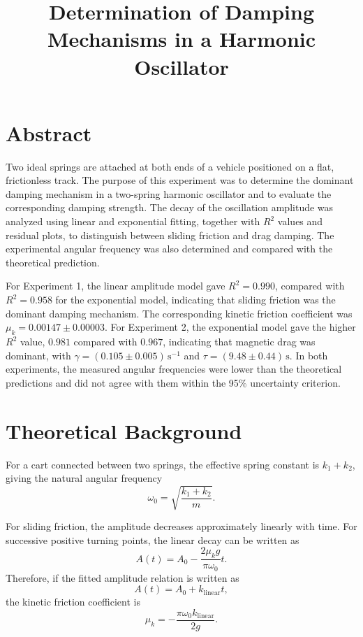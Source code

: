 \documentclass[12pt,a4paper]{article}
\title{Determination of Damping Mechanisms in a Harmonic Oscillator}
\date{}
\begin{document}
\maketitle

\section{Abstract}

Two ideal springs are attached at both ends of a vehicle positioned on a flat, frictionless track. The purpose of this experiment was to determine the dominant damping mechanism in a two-spring harmonic oscillator and to evaluate the corresponding damping strength. The decay of the oscillation amplitude was analyzed using linear and exponential fitting, together with $R^2$ values and residual plots, to distinguish between sliding friction and drag damping. The experimental angular frequency was also determined and compared with the theoretical prediction.

For Experiment 1, the linear amplitude model gave $R^2=0.990$, compared with $R^2=0.958$ for the exponential model, indicating that sliding friction was the dominant damping mechanism. The corresponding kinetic friction coefficient was $\mu_k=0.00147\pm0.00003$. For Experiment 2, the exponential model gave the higher $R^2$ value, $0.981$ compared with $0.967$, indicating that magnetic drag was dominant, with $\gamma=(0.105\pm0.005)\,\mathrm{s^{-1}}$ and $\tau=(9.48\pm0.44)\,\mathrm{s}$. In both experiments, the measured angular frequencies were lower than the theoretical predictions and did not agree with them within the 95\% uncertainty criterion.


\section{Theoretical Background}

For a cart connected between two springs, the effective spring constant is $k_1+k_2$, giving the natural angular frequency
\[
\omega_0=\sqrt{\frac{k_1+k_2}{m}}.
\]

For sliding friction, the amplitude decreases approximately linearly with time. For successive positive turning points, the linear decay can be written as
\[
A(t)=A_0-\frac{2\mu_k g}{\pi\omega_0}t.
\]
Therefore, if the fitted amplitude relation is written as
\[
A(t)=A_0+k_{\mathrm{linear}}t,
\]
the kinetic friction coefficient is
\[
\mu_k=-\frac{\pi\omega_0 k_{\mathrm{linear}}}{2g}.
\]
\end{document}
